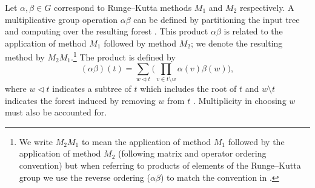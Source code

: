 Let $\alpha, \beta \in G$ correspond to Runge--Kutta methods $M_1$ and $M_2$
respectively.
A multiplicative group operation $\alpha\beta$ can be defined
by partitioning the input tree and computing over the resulting 
forest \cite{Butcher2008_book}.
This product $\alpha\beta$ is related to the application
of method $M_1$ followed by method $M_2$; 
we denote the resulting method by $M_2M_1$.\footnote{We write
	$M_2M_1$ to mean the application of method $M_1$
	followed by the application of method $M_2$ 
	(following matrix and operator ordering convention) 
	but when referring to products of elements of the
	Runge--Kutta group we use the reverse ordering ($\alpha\beta$) 
	to match the convention in \cite{Butcher2008_book}.}
The product is defined by
\begin{equation}\label{eq:Group_operation}
	(\alpha\beta)(t) = \sum_{w \lhd t} \biggl(\prod_{v \in t \setminus w} \alpha(v)\beta(w)\biggr),
\end{equation}
where $w \lhd t$ indicates a subtree of $t$ which includes the
root of $t$ and $w \setminus t$ indicates the forest induced
by removing $w$ from $t$ \cite{Butcher2008_book}.
Multiplicity in choosing $w$ must also be accounted for.


